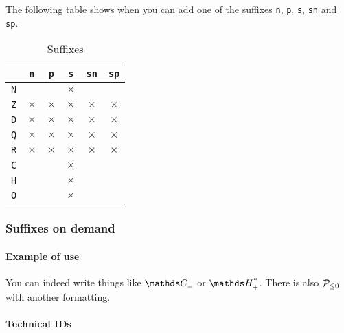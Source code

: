 \documentclass[12pt,a4paper]{article}
\theoremstyle{definition}
\begin{document}
\medskip

The following table shows when you can add one of the suffixes \verb+n+, \verb+p+, \verb+s+, \verb+sn+ and \verb+sp+.

\newcommand\xx{\phantom{$\times$}}
\begin{table}[h]
    \caption{Suffixes}
    \begin{center}
        \begin{tabular}{c|c|c|c|c|c}
  & \verb+n+ & \verb+p+ & \verb+s+ & \verb+sn+ & \verb+sp+ \\
\hline \verb+N+ & \xx & \xx & $\times$ & \xx & \xx \\
\hline \verb+Z+ & $\times$ & $\times$ & $\times$ & $\times$ & $\times$ \\
\hline \verb+D+ & $\times$ & $\times$ & $\times$ & $\times$ & $\times$ \\
\hline \verb+Q+ & $\times$ & $\times$ & $\times$ & $\times$ & $\times$ \\
\hline \verb+R+ & $\times$ & $\times$ & $\times$ & $\times$ & $\times$ \\
\hline \verb+C+ & \xx & \xx & $\times$ & \xx & \xx \\
\hline \verb+H+ & \xx & \xx & $\times$ & \xx & \xx \\
\hline \verb+O+ & \xx & \xx & $\times$ & \xx & \xx \\
        \end{tabular}
    \end{center}
    \label{default}
\end{table}



    \subsubsection{Suffixes on demand}

        \paragraph{Example of use}

\begin{tcblisting}{}
You can indeed write things like $\specialset{\CC}{n}$ or $\specialset{\HH}{sp}$. 
There is also $\specialset*{\probaset{P}}{n}$ with another formatting.
\end{tcblisting}


        \paragraph{Technical IDs}
\end{document}
